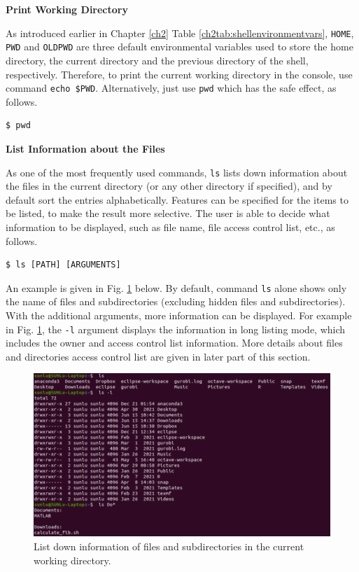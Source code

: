 \textbf{Print Working Directory}

As introduced earlier in Chapter \ref{ch2} Table \ref{ch2tab:shellenvironmentvars}, \verb|HOME|, \verb|PWD| and \verb|OLDPWD| are three default environmental variables used to store the home directory, the current directory and the previous directory of the shell, respectively. Therefore, to print the current working directory in the console, use command \verb|echo $PWD|. Alternatively, just use \verb|pwd| which has the safe effect, as follows.

\begin{lstlisting}
$ pwd
\end{lstlisting}

\textbf{List Information about the Files}

As one of the most frequently used commands, \verb|ls| lists down information about the files in the current directory (or any other directory if specified), and by default sort the entries alphabetically. Features can be specified for the items to be listed, to make the result more selective. The user is able to decide what information to be displayed, such as file name, file access control list, etc., as follows.
\begin{lstlisting}
$ ls [PATH] [ARGUMENTS]
\end{lstlisting}

An example is given in Fig. \ref{ch4fig:lscommandexample} below. By default, command \verb|ls| alone shows only the name of files and subdirectories (excluding hidden files and subdirectories). With the additional arguments, more information can be displayed. For example in Fig. \ref{ch4fig:lscommandexample}, the \verb|-l| argument displays the information in long listing mode, which includes the owner and access control list information. More details about files and directories access control list are given in later part of this section.

\begin{figure}
	\centering
	\includegraphics[width=350pt]{chapters/chapter4/figures/ls_command_example.png}
	\caption{List down information of files and subdirectories in the current working directory.} \label{ch4fig:lscommandexample}
\end{figure}

